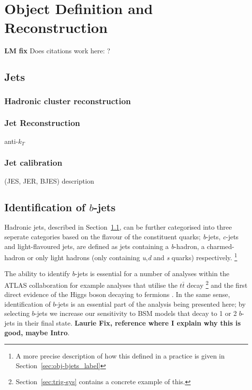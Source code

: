 \chapter{Object Definition and Reconstruction}
\label{sec:obj}
\textbf{LM fix} Does citations work here: \cite{trig-evtGen}?


\section{Jets}
\label{sec:obj-jets}
  \subsection{Hadronic cluster reconstruction}
  \subsection{Jet Reconstruction}
   anti-$k_T$
   \subsection{Jet calibration}
    (JES, JER, BJES) description
    
   \section{Identification of $b$-jets}
   \label{sec:obj-bjets}

   Hadronic jets, described in Section~\ref{sec:obj-jets}, can be further categorised into three seperate categories based on the flavour of the constituent quarks;
   \textit{b}-jets, \textit{c}-jets and light-flavoured jets, are defined as jets containing a \textit{b}-hadron, 
   a charmed-hadron or only light hadrons (only containing \textit{u},\textit{d} and \textit{s} quarks) respectively.
   \footnote{A more precise description of how this defined in a practice is given in Section~\ref{sec:obj-bjets_label}}
  
   The ability to identify $b$-jets is essential for a number of analyses within the ATLAS collaboration
   for example analyses that utilise the $t\bar{t}$ decay \cite{obj-ttbar} \footnote{Section~\ref{sec:trig-sys} contains a concrete example of this.}
   and the first direct evidence of the Higgs boson decaying to fermions \cite{obj-Hbb}.
   In the same sense, identification of $b$-jets is an essential part of the analysis being presented here;
   by selecting $b$-jets we increase our sensitivity to BSM models that decay to 1 or 2 $b$-jets in their final state.
    \textbf{Laurie Fix, reference where I explain why this is good, maybe Intro}.
   
